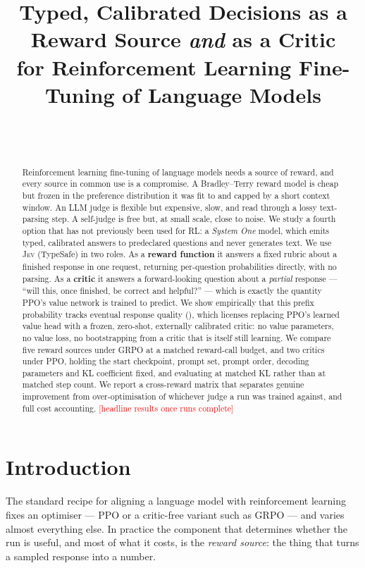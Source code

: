 \documentclass[11pt]{article}
\title{Typed, Calibrated Decisions as a Reward Source \emph{and} as a Critic\\
for Reinforcement Learning Fine-Tuning of Language Models}
\author{%
  \\ \\
  \texttt{}%
}
\date{}
\newcommand{\jev}{\textsc{Jev}}
\newcommand{\todo}[1]{\textcolor{red}{[#1]}}
\begin{document}
\maketitle

\begin{abstract}
Reinforcement learning fine-tuning of language models needs a source of reward,
and every source in common use is a compromise. A Bradley--Terry reward model is
cheap but frozen in the preference distribution it was fit to and capped by a
short context window. An LLM judge is flexible but expensive, slow, and read
through a lossy text-parsing step. A self-judge is free but, at small scale,
close to noise. We study a fourth option that has not previously been used for
RL: a \emph{System One} model, which emits typed, calibrated answers to
predeclared questions and never generates text. We use \jev{} (TypeSafe) in two
roles. As a \textbf{reward function} it answers a fixed rubric about a finished
response in one request, returning per-question probabilities directly, with no
parsing. As a \textbf{critic} it answers a forward-looking question about a
\emph{partial} response --- ``will this, once finished, be correct and
helpful?'' --- which is exactly the quantity PPO's value network is trained to
predict. We show empirically that this prefix probability tracks eventual
response quality
(\unskip),
which licenses replacing PPO's learned value head with a frozen, zero-shot,
externally calibrated critic: no value parameters, no value loss, no
bootstrapping from a critic that is itself still learning.
We compare five reward sources under GRPO at a matched reward-call budget, and
two critics under PPO, holding the start checkpoint, prompt set, prompt order,
decoding parameters and KL coefficient fixed, and evaluating at matched
KL rather than at matched step count. We report a cross-reward matrix that
separates genuine improvement from over-optimisation of whichever judge a run
was trained against, and full cost accounting.
\todo{headline results once runs complete}
\end{abstract}

\section{Introduction}

The standard recipe for aligning a language model with reinforcement learning
fixes an optimiser --- PPO \citep{schulman2017ppo,ouyang2022instructgpt} or a
critic-free variant such as GRPO \citep{shao2024deepseekmath} --- and varies
almost everything else. In practice the component that determines whether the
run is useful, and most of what it costs, is the \emph{reward source}: the thing
that turns a sampled response into a number.
\end{document}
